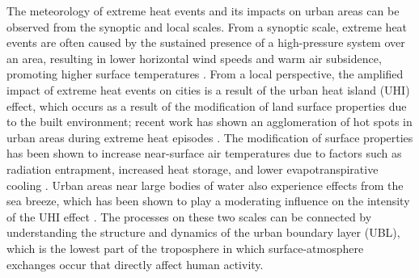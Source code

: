 The meteorology of extreme heat events and its impacts on urban areas can be observed from the synoptic and local scales. From a synoptic scale, extreme heat events are often caused by the sustained presence of a high-pressure system over an area, resulting in lower horizontal wind speeds and warm air subsidence, promoting higher surface temperatures \citep{black2004, miralles2014}. From a local perspective, the amplified impact of extreme heat events on cities is a result of the urban heat island (UHI) effect, which occurs as a result of the modification of land surface properties due to the built environment; recent work has shown an agglomeration of hot spots in urban areas during extreme heat episodes \citep{shreevastava2021}. The modification of surface properties has been shown to increase near-surface air temperatures due to factors such as radiation entrapment, increased heat storage, and lower evapotranspirative cooling \citep{chen2014, li2013, ramamurthy2017a, zhao2018}. Urban areas near large bodies of water also experience effects from the sea breeze, which has been shown to play a moderating influence on the intensity of the UHI effect \citep{hu2016, jiang2019, stefanon2014}. The processes on these two scales can be connected by understanding the structure and dynamics of the urban boundary layer (UBL), which is the lowest part of the troposphere in which surface-atmosphere exchanges occur that directly affect human activity. 

